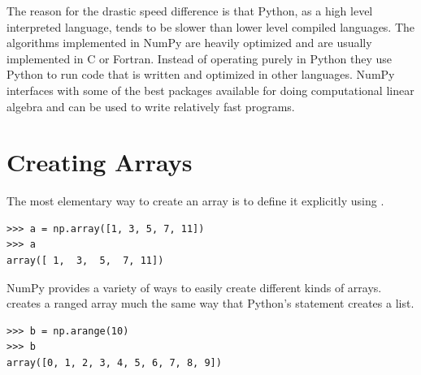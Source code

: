 % 
% 
% 
The reason for the drastic speed difference is that Python, as a high
level interpreted language, tends to be slower than lower level compiled
languages. The algorithms implemented in NumPy are heavily optimized and
are usually implemented in C or Fortran. Instead of operating purely in
Python they use Python to run code that is written and optimized in
other languages. NumPy interfaces with some of the best packages
available for doing computational linear algebra and can be used to
write relatively fast programs.


\section*{Creating Arrays} The most elementary way to create an array is
to define it explicitly using . 
\begin{lstlisting}
>>> a = np.array([1, 3, 5, 7, 11]) 
>>> a
array([ 1,  3,  5,  7, 11]) 
\end{lstlisting} 

NumPy provides a variety of
ways to easily create different kinds of arrays. 
creates a ranged array much the same way that Python's 
statement creates a list. 
\begin{lstlisting}
>>> b = np.arange(10) 
>>> b
array([0, 1, 2, 3, 4, 5, 6, 7, 8, 9]) 
\end{lstlisting}

